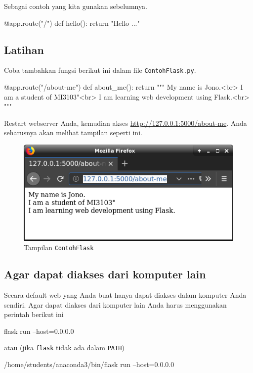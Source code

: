 \documentclass[a4paper,11pt]{extarticle}
\begin{document}
Sebagai contoh yang kita gunakan sebelumnya.
\begin{pythoncode}
@app.route("/")
def hello():
    return "Hello ..."
\end{pythoncode}

\subsection{Latihan}
Coba tambahkan fungsi berikut ini dalam file \texttt{ContohFlask.py}.
\begin{pythoncode}
@app.route("/about-me")
def about_me():
    return """
    My name is Jono.<br>
    I am a student of MI3103"<br>
    I am learning web development using Flask.<br>
    """
\end{pythoncode}

Restart webserver Anda, kemudian akses \url{http://127.0.0.1:5000/about-me}.
Anda seharusnya akan melihat tampilan seperti ini.
\begin{figure}[h!]
{\centering
\includegraphics[scale=0.5]{images/Firefox_Hello_v2.png}
\par}
\caption{Tampilan \texttt{ContohFlask}}
\end{figure}

\subsection{Agar dapat diakses dari komputer lain}

Secara default web yang Anda buat hanya dapat diakses dalam komputer Anda sendiri.
Agar dapat diakses dari komputer lain Anda harus menggunakan perintah berikut ini
\begin{textcode}
flask run --host=0.0.0.0
\end{textcode}
atau (jika \texttt{flask} tidak ada dalam \texttt{PATH})
\begin{textcode}
/home/students/anaconda3/bin/flask run --host=0.0.0.0
\end{textcode}
\end{document}
